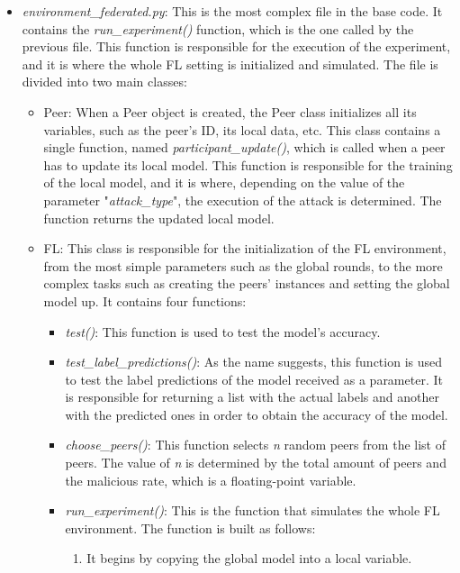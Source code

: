 \begin{itemize}
        \item \textit{environment\_federated.py}: This is the most complex file in the base code. It contains the \textit{run\_experiment()} function, which is the one called by the previous file. This function is responsible for the execution of the experiment, and it is where the whole FL setting is initialized and simulated. The file is divided into two main classes:
        \begin{itemize}
                \item Peer: When a Peer object is created, the Peer class initializes all its variables, such as the peer's ID, its local data, etc. This class contains a single function, named \textit{participant\_update()}, which is called when a peer has to update its local model. This function is responsible for the training of the local model, and it is where, depending on the value of the parameter "\textit{attack\_type}", the execution of the attack is determined. The function returns the updated local model.
                \item FL: This class is responsible for the initialization of the FL environment, from the most simple parameters such as the global rounds, to the more complex tasks such as creating the peers' instances and setting the global model up. It contains four functions:
                \begin{itemize}
                        \item \textit{test()}: This function is used to test the model's accuracy.
                        \item \textit{test\_label\_predictions()}: As the name suggests, this function is used to test the label predictions of the model received as a parameter. It is responsible for returning a list with the actual labels and another with the predicted ones in order to obtain the accuracy of the model.
                        \item \textit{choose\_peers()}: This function selects \textit{n} random peers from the list of peers. The value of \textit{n} is determined by the total amount of peers and the malicious rate, which is a floating-point variable.
                        \item \textit{run\_experiment()}: This is the function that simulates the whole FL environment. The function is built as follows:
                        \begin{enumerate}
                                \item It begins by copying the global model into a local variable.

\end{enumerate}
\end{itemize}
\end{itemize}
\end{itemize}

